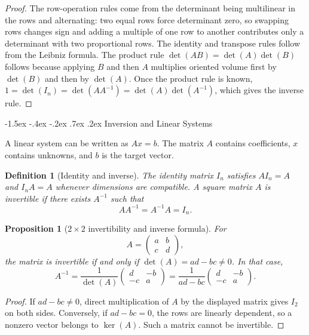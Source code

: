 \documentclass[10pt]{article}
\makeatletter
\renewcommand\section{\@startsection{section}{1}{\z@}%
  {-1.5ex \@plus -.4ex \@minus -.2ex}%
  {.7ex \@plus .2ex}%
  {\normalfont\large\bfseries}}
\theoremstyle{compactdefinition}
\newtheorem{definition}{Definition}[section]
\theoremstyle{compactproposition}
\newtheorem{proposition}{Proposition}[section]
\makeatother
\begin{document}
\begin{proof}
The row-operation rules come from the determinant being multilinear in the rows
and alternating: two equal rows force determinant zero, so swapping rows changes
sign and adding a multiple of one row to another contributes only a determinant
with two proportional rows. The identity and transpose rules follow from the
Leibniz formula. The product rule $\det(AB)=\det(A)\det(B)$ follows because
applying $B$ and then $A$ multiplies oriented volume first by $\det(B)$ and then
by $\det(A)$. Once the product rule is known,
$1=\det(I_n)=\det(AA^{-1})=\det(A)\det(A^{-1})$, which gives the inverse rule.
\end{proof}

\section{Inversion and Linear Systems}

A linear system can be written as $Ax=b$. The matrix $A$ contains coefficients,
$x$ contains unknowns, and $b$ is the target vector.

\begin{definition}[Identity and inverse]
The identity matrix $I_n$ satisfies $AI_n=A$ and $I_nA=A$ whenever dimensions are
compatible. A square matrix $A$ is invertible if there exists $A^{-1}$ such that
\[
AA^{-1}=A^{-1}A=I_n.
\]
\end{definition}

\begin{proposition}[$2\times2$ invertibility and inverse formula]
For
\[
A=\begin{pmatrix}a&b\\c&d\end{pmatrix},
\]
the matrix is invertible if and only if $\det(A)=ad-bc\neq0$. In that case,
\[
\boxed{
A^{-1}=\frac{1}{\det(A)}
\begin{pmatrix}d&-b\\-c&a\end{pmatrix}
=\frac{1}{ad-bc}
\begin{pmatrix}d&-b\\-c&a\end{pmatrix}.}
\]
\end{proposition}

\begin{proof}
If $ad-bc\neq0$, direct multiplication of $A$ by the displayed matrix gives
$I_2$ on both sides. Conversely, if $ad-bc=0$, the rows are linearly dependent,
so a nonzero vector belongs to $\ker(A)$. Such a matrix cannot be invertible.
\end{proof}
\end{document}
